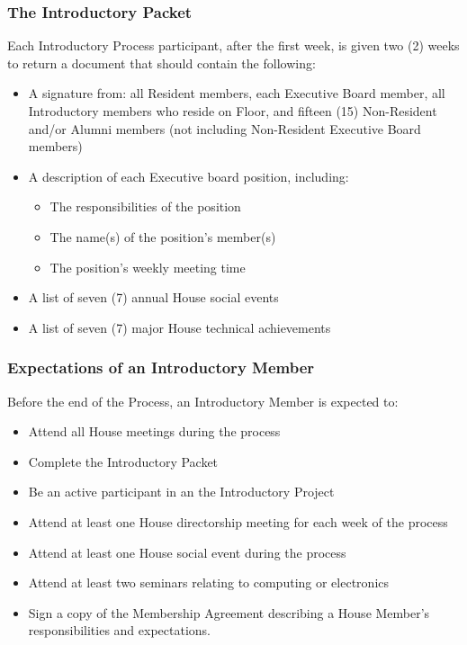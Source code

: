 \documentclass{article}
\newcommand{\bsubsection}[1]{\subsubsection{#1} \label{#1}}
\begin{document}
\bsubsection{The Introductory Packet}
Each Introductory Process participant, after the first week, is given two (2) weeks to return a document that should contain the following:
\begin{itemize}
	\item A signature from: all Resident members, each Executive Board member, all Introductory members who reside on Floor, and fifteen (15) Non-Resident and/or Alumni members (not including Non-Resident Executive Board members)
	\item A description of each Executive board position, including:
	\begin{itemize}
		\item The responsibilities of the position
		\item The name(s) of the position’s member(s)
		\item The position’s weekly meeting time
	\end{itemize}
	\item A list of seven (7) annual House social events
	\item A list of seven (7) major House technical achievements
\end{itemize}
\bsubsection{Expectations of an Introductory Member}
Before the end of the Process, an Introductory Member is expected to:
\begin{itemize}
\item Attend all House meetings during the process
\item Complete the Introductory Packet
\item Be an active participant in an the Introductory Project
\item Attend at least one House directorship meeting for each week of the process
\item Attend at least one House social event during the process
\item Attend at least two seminars relating to computing or electronics
\item Sign a copy of the Membership Agreement describing a House Member’s responsibilities and expectations.
\end{itemize}
\end{document}
